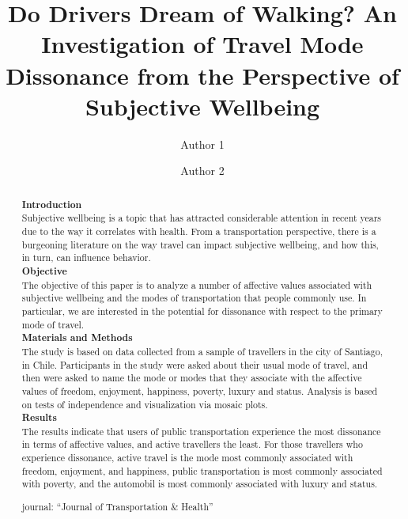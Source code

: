 \documentclass[]{elsarticle} %
\begin{document}
\begin{frontmatter}

  \title{Do Drivers Dream of Walking? An Investigation of Travel Mode Dissonance
from the Perspective of Subjective Wellbeing}
    \author[Some University]{Author 1}
    \author[Some School]{Author 2}
      \address[Some University]{Department, Street, City, State, Zip}
    \address[Some School]{Department, Street, City, State, Zip}
    
  \begin{abstract}
  \textbf{Introduction}\\
  Subjective wellbeing is a topic that has attracted considerable
  attention in recent years due to the way it correlates with health. From
  a transportation perspective, there is a burgeoning literature on the
  way travel can impact subjective wellbeing, and how this, in turn, can
  influence behavior.\\
  \textbf{Objective}\\
  The objective of this paper is to analyze a number of affective values
  associated with subjective wellbeing and the modes of transportation
  that people commonly use. In particular, we are interested in the
  potential for dissonance with respect to the primary mode of travel.\\
  \textbf{Materials and Methods}\\
  The study is based on data collected from a sample of travellers in the
  city of Santiago, in Chile. Participants in the study were asked about
  their usual mode of travel, and then were asked to name the mode or
  modes that they associate with the affective values of freedom,
  enjoyment, happiness, poverty, luxury and status. Analysis is based on
  tests of independence and visualization via mosaic plots.\\
  \textbf{Results}\\
  The results indicate that users of public transportation experience the
  most dissonance in terms of affective values, and active travellers the
  least. For those travellers who experience dissonance, active travel is
  the mode most commonly associated with freedom, enjoyment, and
  happiness, public transportation is most commonly associated with
  poverty, and the automobil is most commonly associated with luxury and
  status.
  
  journal: ``Journal of Transportation \& Health''
  \end{abstract}
  
 \end{frontmatter}
\end{document}
